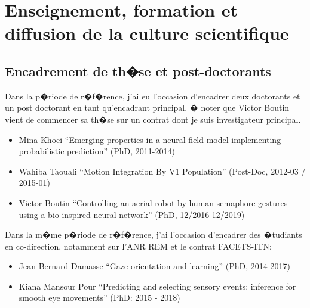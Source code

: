 \chapter{Enseignement, formation et diffusion de la culture scientifique} %

\section{Encadrement de th�se et post-doctorants} %

Dans la p�riode de r�f�rence, j'ai eu l'occasion d'encadrer deux doctorants et un post doctorant en tant qu'encadrant principal. � noter que Victor Boutin vient de commencer sa th�se sur un contrat dont je suis investigateur principal.
\begin{itemize}
	\item Mina Khoei 	``Emerging properties in a neural field model implementing probabilistic prediction'' (PhD, 2011-2014)
	\item Wahiba Taouali 	``Motion Integration By V1 Population'' (Post-Doc, 2012-03 / 2015-01)
	\item Victor Boutin 	``Controlling an aerial robot by human semaphore gestures using a bio-inspired neural network'' (PhD, 12/2016-12/2019)
\end{itemize}


Dans la m�me p�riode de r�f�rence, j'ai l'occasion d'encadrer des �tudiants en co-direction, notamment sur l'ANR REM et le contrat FACETS-ITN:
\begin{itemize}
	\item Jean-Bernard Damasse 	``Gaze orientation and learning'' (PhD, 2014-2017)
	\item Kiana Mansour Pour 	``Predicting and selecting sensory events: inference for smooth eye movements'' (PhD: 2015 - 2018)
\end{itemize}

